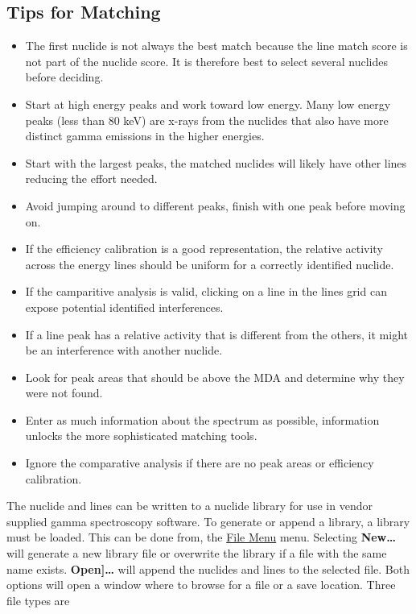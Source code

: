 \documentclass[12pt,report,justified]{SANDreport}
\begin{document}
\subsection{Tips for Matching}\label{sec:match_tips}
\begin{itemize}
    \item The first nuclide is not always the best match because the line match score is not part of the nuclide
    score. It is therefore best to select several nuclides before deciding.
    \item Start at high energy peaks and work toward low energy. Many low energy peaks (less than 80 keV) are
    x-rays from the nuclides that also have more distinct gamma emissions in the higher energies.
    \item Start with the largest peaks, the matched nuclides will likely have other lines reducing the effort
    needed.
    \item Avoid jumping around to different peaks, finish with one peak before moving on.
    \item If the efficiency calibration is a good representation, the relative activity across the energy lines
    should be uniform for a correctly identified nuclide.
    \item If the camparitive analysis is valid, clicking on a line in the lines grid can expose potential identified
    interferences.
    \item If a line peak has a relative activity that is different from the others, it might be an interference
    with another nuclide.
    \item Look for peak areas that should be above the MDA and determine why they were not found.
    \item Enter as much information about the spectrum as possible, information unlocks the more sophisticated
    matching tools.
    \item Ignore the comparative analysis if there are no peak areas or efficiency calibration.
\end{itemize}
The nuclide and lines can be written to a nuclide library for use in vendor supplied gamma spectroscopy software.
To generate or append a library, a library must be loaded. This can be done from, the
\hyperref[sec:file_menu]{File Menu} menu. Selecting \textbf{New\ldots} will generate a new library file or overwrite
the library if a file with the same name exists. \textbf{Open]\ldots} will append the nuclides and lines to the
selected file. Both options will open a window where to browse for a file or a save location. Three file types are
\end{document}
